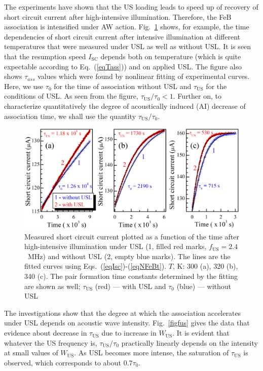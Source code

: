 \documentclass[sn-mathphys]{sn-jnl}%
\theoremstyle{thmstyleone}%
\theoremstyle{thmstyletwo}%
\theoremstyle{thmstylethree}%
\begin{document}
The experiments have shown that the US loading leads to
speed up of recovery of short circuit current after high-intensive illumination.
Therefore, the  FeB association is intensified under AW action.
Fig.~\ref{figIscUs} shows, for example, the time dependencies of short circuit current
after intensive illumination at different temperatures
that were measured under USL as well as without USL.
It is seen that the resumption speed $I_\mathrm{SC}$ depends both on temperature
(which is quite expectable according to Eq.~(\ref{eqTass})) and on applied USL.
The figure also shows $\tau_{ass}$ values which were found by nonlinear fitting of experimental curves.
Here, we use $\tau_{0}$ for the time of association without USL
and $\tau_\mathrm{US}$ for the conditions of USL.
As seen from the figure, $\tau_\mathrm{US}/\tau_{0}< 1$.
Further on, to characterize quantitatively the degree of
acoustically induced (AI) decrease of association time, we shall use the quantity $\tau_\mathrm{US}/\tau_{0}$.

\begin{figure}
\centering
 \includegraphics[width=1.0\textwidth]{Fig3}
\caption{
Measured short circuit current plotted as a function of the time after high-intensive illumination
under USL (1, filled red marks, $f_\mathrm{US} = 2.4$~MHz) and without USL (2, empty blue marks).
The lines are the fitted curves using Eqs.~(\ref{eqIsc})-(\ref{eqNFeBt}).
$T$, K: 300 (a), 320 (b), 340 (c).
The pair formation time constants determined by the fitting are shown as well;
$\tau_\mathrm{US}$ (red) --- with USL and $\tau_{0}$ (blue) --- without USL
}
\label{figIscUs}       %
\end{figure}

The investigations show that the degree at which the association accelerates
under USL depends on acoustic wave intensity.
Fig.~\ref{figfus} gives the data that evidence about decrease
in $\tau_\mathrm{US}$ due to increase in $W_\mathrm{US}$.
It is evident that whatever the US frequency is, $\tau_\mathrm{US}/\tau_{0}$
practically linearly depends on the intensity at small values of $W_\mathrm{US}$.
As USL becomes more intense, the saturation of $\tau_\mathrm{US}$ is observed,
which corresponds to about 0.7$\tau_{0}$.
\end{document}

